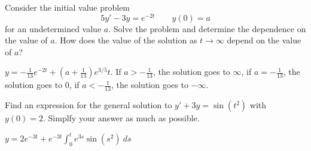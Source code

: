 \begin{exercise}
Consider the initial value problem
\[ 5y' - 3y = e^{-2t} \qquad y(0) = a \] for an undetermined value $a$. Solve the problem and determine the dependence on the value of $a$. How does the value of the solution as $t \rightarrow \infty$ depend on the value of $a$?
\end{exercise}
\comboSol{%
}
{%
$y = -\frac{1}{13}e^{-2t} + \left(a + \frac{1}{13}\right)e^{3/5}t$. If $a > -\frac{1}{13}$, the solution goes to $\infty$, if $a = -\frac{1}{13}$, the solution goes to 0, if $a < -\frac{1}{13}$, the solution goes to $-\infty$.
}

\begin{exercise}
Find an expression for the general solution to $y' + 3y = \sin(t^2)$ with $y(0) = 2$. Simplfy your answer as much as possible. 
\end{exercise}
\comboSol{%
}
{%
$y = 2e^{-3t} + e^{-3t}\int_0^t e^{3s}\sin(s^2)\ ds$
}

\setcounter{exercise}{100}





